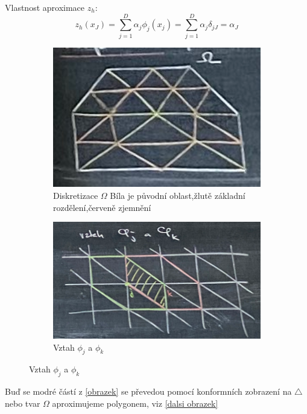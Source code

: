 \documentclass[../main.tex]{subfiles}
\begin{document}
Vlastnost aproximace $z_h$:
\begin{equation}
    z_h(x_J) = \sum_{j=1}^D \alpha_j \phi_j (x_j)= \sum_{j=1}^D \alpha_j \delta_{jJ} = \alpha_J
\end{equation}

\begin{remark}
    \begin{figure}
        \centering
        \begin{subfigure}[bt]{0.5\textwidth}
            \centering
            \includegraphics[width=1\textwidth]{images/diskretizace.png}
            \caption{Diskretizace $\Omega$ \hfill\break Bíla je původní oblast,\hfill\break žlutě základní rozdělení,\hfill\break červeně zjemnění \hfill}
        \end{subfigure}
        \hfill
        \begin{subfigure}[t]{0.5\textwidth}
            \centering
            \includegraphics[width=1\textwidth]{images/vztahphi.png}
            \caption{Vztah $\phi_j$ a $\phi_k$}
        \end{subfigure}
    \end{figure}

Buď se modré částí z \ref{obrazek} se převedou pomocí konformních zobrazení na $\triangle$ nebo tvar $\Omega$ aproximujeme polygonem, viz \ref{dalsi obrazek}
\end{remark}
\end{document}
